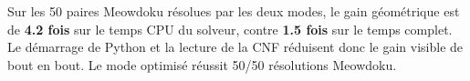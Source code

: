 Sur les 50 paires Meowdoku résolues par les deux modes, le gain géométrique est de \textbf{4.2 fois} sur le temps CPU du solveur, contre \textbf{1.5 fois} sur le temps complet. Le démarrage de Python et la lecture de la CNF réduisent donc le gain visible de bout en bout.
Le mode optimisé réussit 50/50 résolutions Meowdoku.
